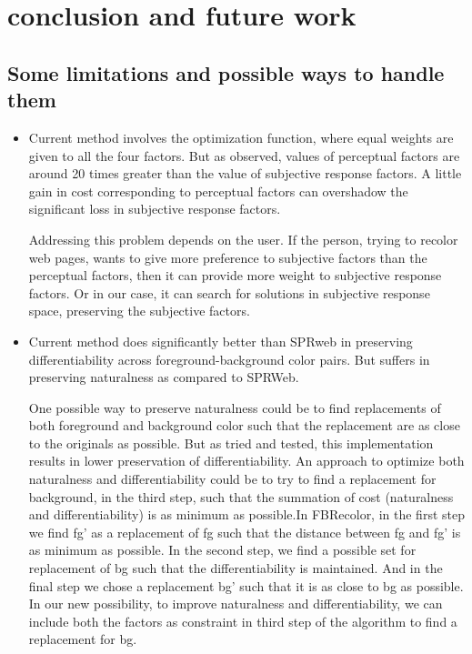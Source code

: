 \chapter{conclusion and future work}
\thispagestyle{plain}

\label{Conclusion and future work}


\section{Some limitations and possible ways to handle them}
\label{limitations}


\begin{itemize}
\item{} Current method involves the optimization function, where equal weights are given to all the four factors. But as observed, values of perceptual factors are around 20 times greater than the value of subjective response factors. A little gain in cost corresponding to perceptual factors can overshadow the significant loss in subjective response factors.


Addressing this problem depends on the user. If the person, trying to recolor web pages, wants to give more preference to subjective factors than the perceptual factors, then it can provide more weight to subjective response factors. Or in our case, it can search for solutions in subjective response space, preserving the subjective factors. 

\item{} Current method does significantly better than SPRweb in preserving differentiability across foreground-background color pairs. But suffers in preserving naturalness as compared to SPRWeb.  


One possible way to preserve naturalness could be to find replacements of both foreground and background color such that the replacement are as close to the originals as possible. But as tried and tested, this implementation results in lower preservation of differentiability. An approach to optimize both naturalness and differentiability could be to try to find a replacement for background, in the third step, such that the summation of cost (naturalness and differentiability) is as minimum as possible.In FBRecolor, in the first step we find fg’ as a replacement of fg such that the distance between fg and fg’ is as minimum as possible. In the second step, we find a possible set for replacement of bg such that the differentiability is maintained. And in the final step we chose a replacement bg’ such that it is as close to bg as possible. In our new possibility, to improve naturalness and differentiability, we can include both the factors as constraint in third step of the algorithm to find a replacement for bg.



\end{itemize}
